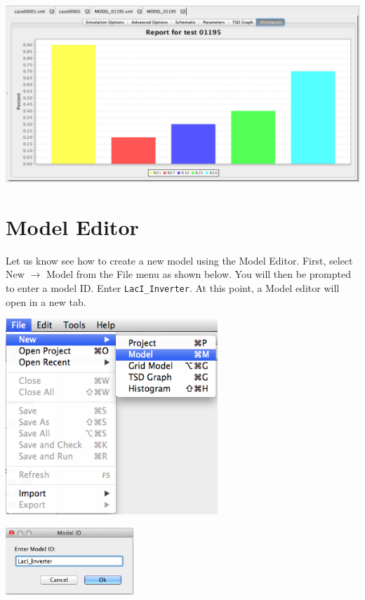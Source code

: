 \documentclass[titlepage,11pt]{article}
\begin{document}
\begin{center}
\includegraphics[width=160mm]{screenshots/FBAresults}
\end{center}

\section{Model Editor}

\noindent
Let us know see how to create a new model using the Model Editor.  First, select New $\rightarrow$ Model from the File menu as shown below. You will then be prompted to enter a model ID.  Enter {\tt LacI\_Inverter}.  At this point, a Model editor will open in a new tab.

\begin{center}
\includegraphics[width=80mm]{screenshots/newModel}
\end{center}

\begin{center}
\includegraphics[height=25mm]{screenshots/ModelIdGT}
\end{center}
\end{document}
